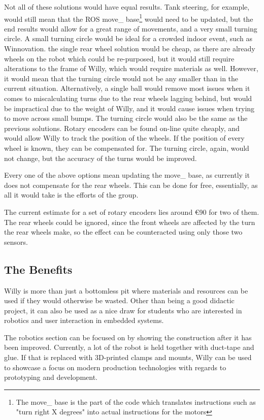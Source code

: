 Not all of these solutions would have equal results.
Tank steering, for example, would still mean that the ROS move\_ base\footnote{The move\_ base is the part of the code which translates instructions such as "turn right X degrees" into actual instructions for the motors} would need to be updated, but the end results would allow for a great range of movements, and a very small turning circle.
A small turning circle would be ideal for a crowded indoor event, such as Winnovation.
the single rear wheel solution would be cheap, as there are already wheels on the robot which could be re-purposed, but it would still require alterations to the frame of Willy, which would require materials as well.
However, it would mean that the turning circle would not be any smaller than in the current situation.
Alternatively, a single ball would remove most issues when it comes to miscalculating turns due to the rear wheels lagging behind, but would be impractical due to the weight of Willy, and it would cause issues when trying to move across small bumps.
The turning circle would also be the same as the previous solutions.
Rotary encoders can be found on-line quite cheaply, and would allow Willy to track the position of the wheels.
If the position of every wheel is known, they can be compensated for.
The turning circle, again, would not change, but the accuracy of the turns would be improved.

Every one of the above options mean updating the move\_ base, as currently it does not compensate for the rear wheels.
This can be done for free, essentially, as all it would take is the efforts of the group.

The current estimate for a set of rotary encoders lies around \euro 90 for two of them.
The rear wheels could be ignored, since the front wheels are affected by the turn the rear wheels make, so the effect can be counteracted using only those two sensors.
\clearpage
\subsection{The Benefits}
Willy is more than just a bottomless pit where materials and resources can be used if they would otherwise be wasted.
Other than being a good didactic project, it can also be used as a nice draw for students who are interested in robotics and user interaction in embedded systems.

The robotics section can be focused on by showing the construction after it has been improved.
Currently, a lot of the robot is held together with duct-tape and glue.
If that is replaced with 3D-printed clamps and mounts, Willy can be used to showcase a focus on modern production technologies with regards to prototyping and development.

